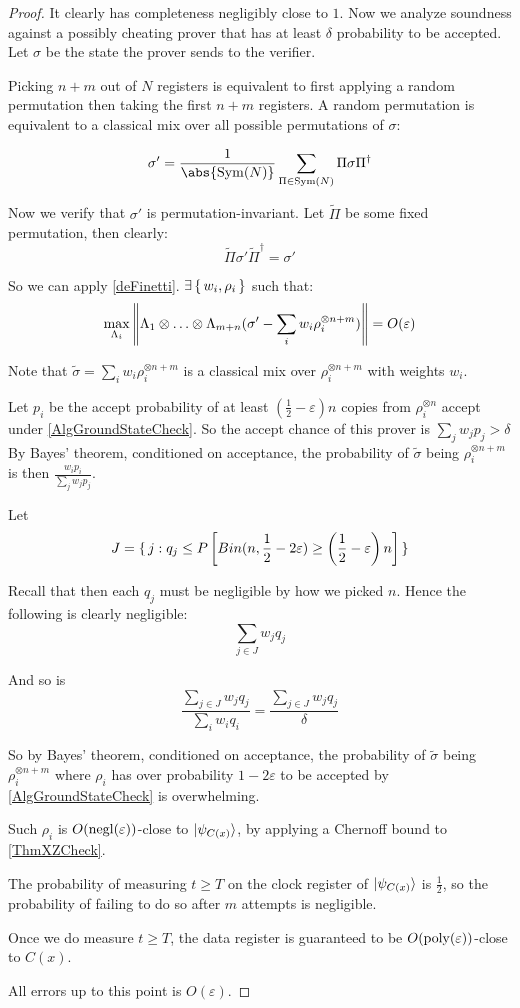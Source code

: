 \begin{proof}
	It clearly has completeness negligibly close to $1$. Now we analyze soundness against a possibly cheating prover that has at least $\delta$ probability to be accepted. Let $\sigma$ be the state the prover sends to the verifier.

	Picking $n+m$ out of $N$ registers is equivalent to first applying a random permutation then taking the first $n+m$ registers.
	A random permutation is equivalent to a classical mix over all possible permutations of $\sigma$:

	$$\sigma'=\frac{1}{\abs{\Sym(N)}}\sum_{\Pi\in\Sym(N)}\Pi\sigma\Pi^\dagger$$

	Now we verify that $\sigma'$ is permutation-invariant.
	Let $\tilde{\Pi}$ be some fixed permutation, then clearly:
	$$\tilde{\Pi}\sigma'\tilde{\Pi}^\dagger=\sigma'$$

	So we can apply \autoref{deFinetti}. $\exists\set{w_i, \rho_i}$ such that:
	$$\max_{\Lambda_i}\left\lVert\Lambda_1\otimes\ldots\otimes\Lambda_{m+n}(\sigma'-\sum_i w_i\rho_i^{\otimes n+m})\right\rVert=O(\varepsilon)$$

	Note that $\tilde\sigma=\sum_i w_i\rho_i^{\otimes n+m}$ is a classical mix over $\rho_i^{\otimes n+m}$ with weights $w_i$.

	Let $p_i$ be the accept probability of at least $(\frac{1}{2}-\varepsilon)n$ copies from $\rho_i^{\otimes n}$ accept under \autoref{AlgGroundStateCheck}.
	So the accept chance of this prover is $\sum_j w_j p_j>\delta$
	By Bayes' theorem, conditioned on acceptance, the probability of $\tilde{\sigma}$ being $\rho_i^{\otimes n+m}$ is then $\frac{w_i p_i}{\sum_j w_j p_j}$.

	Let
	$$J=\set{j:q_j\leq P\left[Bin(n, \frac{1}{2}-2\varepsilon)\geq\left(\frac{1}{2}-\varepsilon\right)n\right]}$$

	Recall that then each $q_j$ must be negligible by how we picked $n$. Hence the following is clearly negligible:
	$$\sum_{j\in J} w_j q_j$$

	And so is
	$$\frac{\sum_{j\in J} w_j q_j}{\sum_i w_i q_i}=\frac{\sum_{j\in J} w_j q_j}{\delta}$$

	So by Bayes' theorem, conditioned on acceptance, the probability of $\tilde{\sigma}$ being $\rho_i^{\otimes n+m}$ where $\rho_i$ has over probability $1-2\varepsilon$ to be accepted by \autoref{AlgGroundStateCheck} is overwhelming.

	Such $\rho_i$ is $O(\operatorname{negl}(\varepsilon))$-close to $\ket{\psi_{C(x)}}$, by applying a Chernoff bound to \autoref{ThmXZCheck}.

	The probability of measuring $t\geq T$ on the clock register of $\ket{\psi_{C(x)}}$ is $\frac{1}{2}$, so the probability of failing to do so after $m$ attempts is negligible.

	Once we do measure $t\geq T$, the data register is guaranteed to be $O(\operatorname*{\operatorname{poly}}(\varepsilon))$-close to $C(x)$.

	All errors up to this point is $O(\varepsilon)$.
\end{proof}

